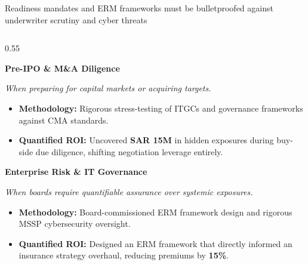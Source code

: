 \documentclass[aspectratio=169, 8pt]{beamer} %
\begin{document}
\begin{frame}{Readiness mandates and ERM frameworks must be bulletproofed against underwriter scrutiny and cyber threats}
    \begin{columns}[T]
        \begin{column}{0.55\textwidth}
            \begin{tcolorbox}[colback=bcgLightGray, colframe=bcgLightGray, arc=0pt, left=2pt, top=1pt, bottom=1pt]
                \textbf{\small \color{bcgGreen} Pre-IPO \& M\&A Diligence}
            \end{tcolorbox}
            \textit{\scriptsize \color{gray} When preparing for capital markets or acquiring targets.}
            \begin{itemize}
                \setlength{\itemsep}{1pt}
                \setlength{\parskip}{0pt}
                \item \textbf{Methodology:} Rigorous stress-testing of ITGCs and governance frameworks against CMA standards.
                \item \textbf{\color{bcgGreen} Quantified ROI:} Uncovered \textbf{SAR 15M} in hidden exposures during buy-side due diligence, shifting negotiation leverage entirely.
            \end{itemize}
            
            \vspace{0.1cm}
            \begin{tcolorbox}[colback=bcgLightGray, colframe=bcgLightGray, arc=0pt, left=2pt, top=1pt, bottom=1pt]
                \textbf{\small \color{bcgGreen} Enterprise Risk \& IT Governance}
            \end{tcolorbox}
            \textit{\scriptsize \color{gray} When boards require quantifiable assurance over systemic exposures.}
            \begin{itemize}
                \setlength{\itemsep}{1pt}
                \setlength{\parskip}{0pt}
                \item \textbf{Methodology:} Board-commissioned ERM framework design and rigorous MSSP cybersecurity oversight.
                \item \textbf{\color{bcgGreen} Quantified ROI:} Designed an ERM framework that directly informed an insurance strategy overhaul, reducing premiums by \textbf{15\%}.
            \end{itemize}
        \end{column}
        

\end{columns}
\end{frame}
\end{document}
